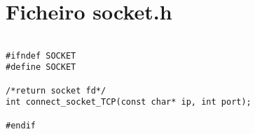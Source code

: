 \section{Ficheiro socket.h}
\label{SOCKETH}

\begin{lstlisting}

#ifndef SOCKET
#define SOCKET

/*return socket fd*/
int connect_socket_TCP(const char* ip, int port);

#endif

\end{lstlisting}